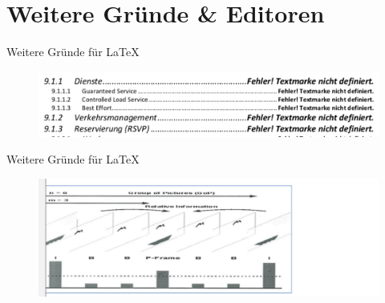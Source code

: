\section{Weitere Gründe \& Editoren}
\begin{frame}{Weitere Gründe für \LaTeX}
	\begin{figure}[tbph]
		\centering
		\includegraphics[width=0.9\linewidth]{./pictures/hoeller1}
		\label{fig:hoeller1}
	\end{figure}
\end{frame}
\begin{frame}{Weitere Gründe für \LaTeX}
	\begin{figure}[tbph]
		\centering
		\includegraphics[width=0.9\linewidth]{./pictures/hoeller2}
		\label{fig:hoeller2}
	\end{figure}
\end{frame}
